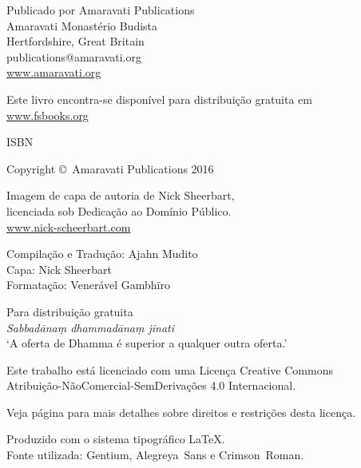 \cleartoverso
\thispagestyle{empty}

{\copyrightsize
\centering
\setlength{\parindent}{0pt}%
\setlength{\parskip}{0.8\baselineskip}%

\thetitle

Publicado por Amaravati Publications\\
Amaravati Monastério Budista\\
Hertfordshire, Great Britain\\
publications@amaravati.org\\
\href{http://amaravati.org}{www.amaravati.org}

Este livro encontra-se disponível para distribuição gratuita em\\
\href{http://fsbooks.org/}{www.fsbooks.org}

ISBN \theISBN

Copyright \copyright\ Amaravati Publications 2016

Imagem de capa de autoria de Nick Sheerbart,\\
licenciada sob Dedicação ao Domínio Público.\\
\href{http://www.nick-scheerbart.com/}{www.nick-scheerbart.com}

Compilação e Tradução: Ajahn Mudito\\
Capa: Nick Sheerbart\\
Formatação: Venerável Gambhīro

\vfill

{\footnotesize

Para distribuição gratuita\\
\textit{Sabbadānaṃ dhammadānaṃ jinati}\\
‘A oferta de Dhamma é superior a qualquer outra oferta.’

Este trabalho está licenciado com uma Licença Creative Commons\\
Atribuição-NãoComercial-SemDerivações 4.0 Internacional.

Veja página \pageref{copyright-details} para mais detalhes sobre direitos e restrições desta licença.

Produzido com o sistema tipográfico \LaTeX.\\
Fonte utilizada: Gentium, Alegreya~Sans e Crimson~Roman.


}}
